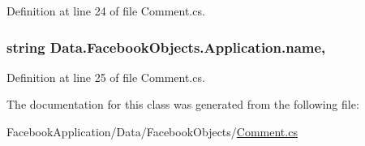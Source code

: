 Definition at line 24 of file Comment.\+cs.

\subsubsection[{\texorpdfstring{name}{name}}]{\setlength{\rightskip}{0pt plus 5cm}string Data.\+Facebook\+Objects.\+Application.\+name\hspace{0.3cm}{\ttfamily [get]}, {\ttfamily [set]}}\hypertarget{class_data_1_1_facebook_objects_1_1_application_a792e5e532e207d17755ec6f6a5b7f47f}{}\label{class_data_1_1_facebook_objects_1_1_application_a792e5e532e207d17755ec6f6a5b7f47f}


Definition at line 25 of file Comment.\+cs.



The documentation for this class was generated from the following file\+:\begin{DoxyCompactItemize}
\item 
Facebook\+Application/\+Data/\+Facebook\+Objects/\hyperlink{_comment_8cs}{Comment.\+cs}\end{DoxyCompactItemize}
